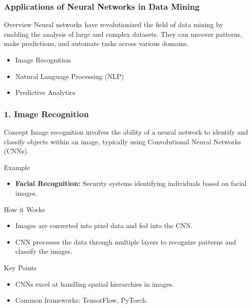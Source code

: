 \documentclass[aspectratio=169]{beamer}
\begin{document}
\begin{frame}[fragile]
    \frametitle{Applications of Neural Networks in Data Mining}
    
    \begin{block}{Overview}
        Neural networks have revolutionized the field of data mining by enabling the analysis of large and complex datasets. 
        They can uncover patterns, make predictions, and automate tasks across various domains.
    \end{block}
    
    \begin{itemize}
        \item Image Recognition
        \item Natural Language Processing (NLP)
        \item Predictive Analytics
    \end{itemize}
    
\end{frame}

\begin{frame}[fragile]
    \frametitle{1. Image Recognition}
    
    \begin{block}{Concept}
        Image recognition involves the ability of a neural network to identify and classify objects within an image, typically using Convolutional Neural Networks (CNNs).
    \end{block}
    
    \begin{exampleblock}{Example}
        \begin{itemize}
            \item \textbf{Facial Recognition:} Security systems identifying individuals based on facial images.
        \end{itemize}
    \end{exampleblock}
    
    \begin{block}{How it Works}
        \begin{itemize}
            \item Images are converted into pixel data and fed into the CNN.
            \item CNN processes the data through multiple layers to recognize patterns and classify the images.
        \end{itemize}
    \end{block}
    
    \begin{block}{Key Points}
        \begin{itemize}
            \item CNNs excel at handling spatial hierarchies in images.
            \item Common frameworks: TensorFlow, PyTorch.
        \end{itemize}
    \end{block}
    
\end{frame}
\end{document}
